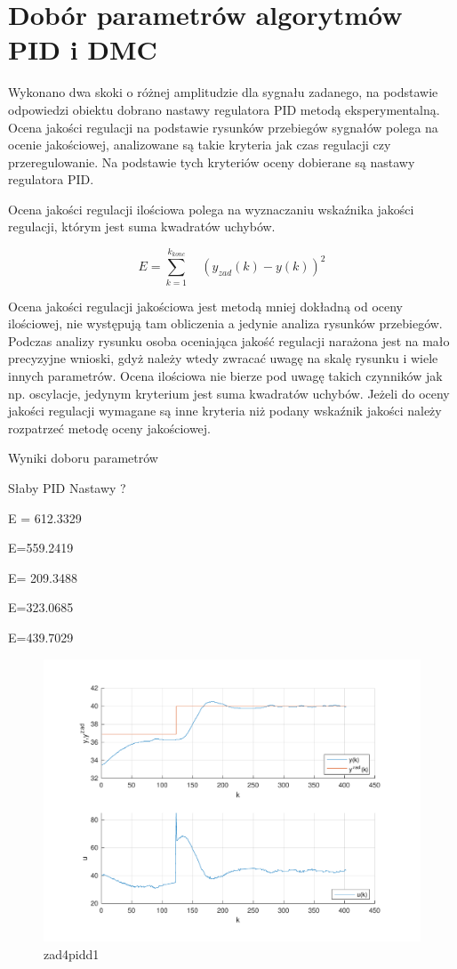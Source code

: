 \section{Dobór parametrów algorytmów PID i DMC}
Wykonano dwa skoki o różnej amplitudzie dla sygnału zadanego, 
na podstawie odpowiedzi obiektu dobrano nastawy regulatora PID metodą eksperymentalną. 
Ocena jakości regulacji na podstawie rysunków przebiegów sygnałów polega na ocenie jakościowej, 
analizowane są takie kryteria jak czas regulacji czy przeregulowanie. 
Na podstawie tych kryteriów oceny dobierane są nastawy regulatora PID.

Ocena jakości regulacji ilościowa polega na wyznaczaniu wskaźnika jakości regulacji, 
którym jest suma kwadratów uchybów. 

$$
E=\sum_{k=1}^{k_{konc}} \quad (y_{zad}(k)-y(k))^{2}
$$

Ocena jakości regulacji jakościowa jest metodą mniej dokładną od oceny ilościowej, 
nie występują tam obliczenia a jedynie analiza rysunków przebiegów. 
Podczas analizy rysunku osoba oceniająca jakość regulacji narażona jest na mało precyzyjne wnioski, 
gdyż należy wtedy zwracać uwagę na skalę rysunku i wiele innych parametrów. 
Ocena ilościowa nie bierze pod uwagę takich czynników jak np. oscylacje, 
jedynym kryterium jest suma kwadratów uchybów. 
Jeżeli do oceny jakości regulacji wymagane są inne kryteria niż podany wskaźnik 
jakości należy rozpatrzeć metodę oceny jakościowej. 

Wyniki doboru parametrów

Słaby PID Nastawy ?


  E = 612.3329

  E=559.2419


  E= 209.3488

  E=323.0685

  E=439.7029


\begin{figure}[H]
    \centering
    \includegraphics[scale=0.75]{../lab/zad_4/zad4pidd1.pdf}
    \caption{zad4pidd1}
\end{figure}

